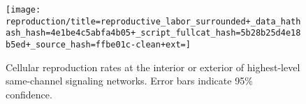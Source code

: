 \begin{figure}[!htbp]
\begin{center}

\texttt{[image: reproduction/title=reproductive\_labor\_surrounded+\_data\_hathash\_hash=4e1be4c5abfa4b05+\_script\_fullcat\_hash=5b28b25d4e18b5ed+\_source\_hash=ffbe01c-clean+ext=]}

\caption{
Cellular reproduction rates at the interior or exterior of highest-level same-channel signaling networks.
Error bars indicate 95\% confidence.
}
\label{fig:reproduction_surrounted}
\end{center}
\end{figure}
